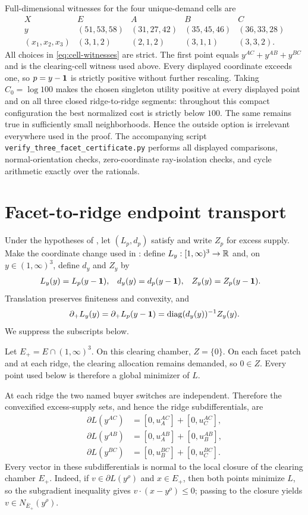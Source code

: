 Full-dimensional witnesses for the four unique-demand cells are
\begin{equation}\label{eq:cell-witnesses}
\begin{array}{c|cccc}
X&E&A&B&C\\ \hline
y&(51,53,58)&(31,27,42)&(35,45,46)&(36,33,28)\\
(x_1,x_2,x_3)&(3,1,2)&(2,1,2)&(3,1,1)&(3,3,2).
\end{array}
\end{equation}
All choices in \eqref{eq:cell-witnesses} are strict. The first point equals $y^{AC}+y^{AB}+y^{BC}$ and is the clearing-cell witness used above. Every displayed coordinate exceeds one, so $p=y-\mathbf{1}$ is strictly positive without further rescaling. Taking $C_0=\log 100$ makes the chosen singleton utility positive at every displayed point and on all three closed ridge-to-ridge segments: throughout this compact configuration the best normalized cost is strictly below $100$. The same remains true in sufficiently small neighborhoods. Hence the outside option is irrelevant everywhere used in the proof. The accompanying script \texttt{verify\_three\_facet\_\allowbreak certificate.py} performs all displayed comparisons, normal-orientation checks, zero-coordinate ray-isolation checks, and cycle arithmetic exactly over the rationals.

\section{Facet-to-ridge endpoint transport}\label{app:cell-gradient}

Under the hypotheses of , let $(L_p,d_p)$ satisfy  and write $Z_p$ for excess supply. Make the coordinate change used in : define $L_y:[1,\infty)^3\to\mathbb{R}$ and, on $y\in(1,\infty)^3$, define $d_y$ and $Z_y$ by
\begin{align*}
L_y(y)&=L_p(y-\mathbf{1}),
&d_y(y)&=d_p(y-\mathbf{1}),
&Z_y(y)&=Z_p(y-\mathbf{1}).
\end{align*}
Translation preserves finiteness and convexity, and
\[
\partial_+ L_y(y)=\partial_+ L_p(y-\mathbf{1})
=\operatorname{diag}(d_y(y))^{-1}Z_y(y).
\]
We suppress the subscripts below.

Let $E_+=E\cap(1,\infty)^3$. On this clearing chamber, $Z=\{0\}$. On each facet patch and at each ridge, the clearing allocation remains demanded, so $0\in Z$. Every point used below is therefore a global minimizer of $L$.

At each ridge the two named buyer switches are independent. Therefore the convexified excess-supply sets, and hence the ridge subdifferentials, are
\begin{align*}
\partial L(y^{AC})&=[0,u_A^{AC}]+[0,u_C^{AC}],\\
\partial L(y^{AB})&=[0,u_A^{AB}]+[0,u_B^{AB}],\\
\partial L(y^{BC})&=[0,u_B^{BC}]+[0,u_C^{BC}].
\end{align*}
Every vector in these subdifferentials is normal to the local closure of the clearing chamber $E_+$. Indeed, if $v\in\partial L(y^\rho)$ and $x\in E_+$, then both points minimize $L$, so the subgradient inequality gives $v\cdot(x-y^\rho)\le0$; passing to the closure yields $v\in N_{\overline E_+}(y^\rho)$.

